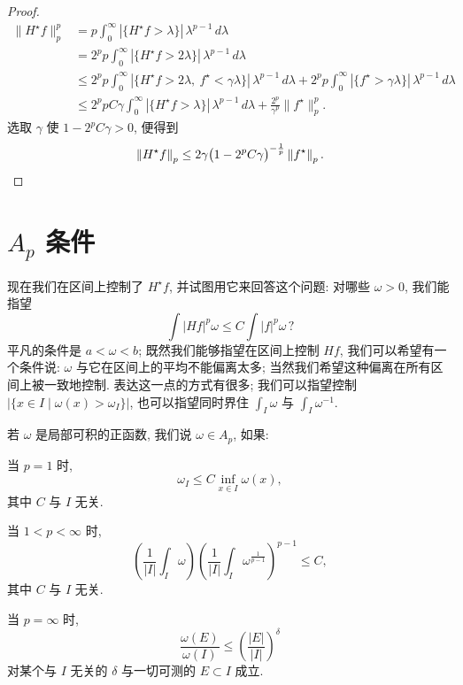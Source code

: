 \begin{proof}
\begin{align*}
\|H^{\star}f\|_{p}^{p}
&=p\int_{0}^{\infty}|\{H^{\star}f>\lambda\}|\,\lambda^{p-1}\,d\lambda \\
&=2^{p}p\int_{0}^{\infty}|\{H^{\star}f>2\lambda\}|\,\lambda^{p-1}\,d\lambda \\
&\leq 2^{p}p\int_{0}^{\infty}|\{H^{\star}f>2\lambda,\ f^{\star}<\gamma\lambda\}|\,\lambda^{p-1}\,d\lambda
+2^{p}p\int_{0}^{\infty}|\{f^{\star}>\gamma\lambda\}|\,\lambda^{p-1}\,d\lambda \\
&\leq 2^{p}pC\gamma\int_{0}^{\infty}|\{H^{\star}f>\lambda\}|\,\lambda^{p-1}\,d\lambda
+\frac{2^{p}}{\gamma^{p}}\|f^{\star}\|_{p}^{p}.
\end{align*}
选取 $\gamma$ 使 $1-2^{p}C\gamma>0$, 便得到
\[
\left\|H^{\star}f\right\|_{p}\leq 2\gamma\bigl(1-2^{p}C\gamma\bigr)^{-\frac{1}{p}}\left\|f^{\star}\right\|_{p}. \qedhere
\]
\end{proof}

\section{\texorpdfstring{$A_p$}{Ap} 条件}
\label{sec:3.2}

现在我们在区间上控制了 $H^{\star}f$, 并试图用它来回答这个问题: 对哪些 $\omega>0$, 我们能指望
\[
\int|H f|^{p}\omega\leq C\int|f|^{p}\omega\,?
\]
平凡的条件是 $a<\omega<b$; 既然我们能够指望在区间上控制 $Hf$, 我们可以希望有一个条件说: $\omega$ 与它在区间上的平均不能偏离太多; 当然我们希望这种偏离在所有区间上被一致地控制. 表达这一点的方式有很多; 我们可以指望控制 $|\{x\in I \mid \omega(x)>\omega_I\}|$, 也可以指望同时界住 $\int_I\omega$ 与 $\int_I\omega^{-1}$.

\begin{definition}\label{def:3.3}
若 $\omega$ 是局部可积的正函数, 我们说 $\omega\in A_p$, 如果:

当 $p=1$ 时,
\[
\omega_{I}\leq C\inf_{x\in I}\omega(x),
\]
其中 $C$ 与 $I$ 无关.

当 $1<p<\infty$ 时,
\[
\left(\frac{1}{|I|}\int_{I}\omega\right)\left(\frac{1}{|I|}\int_{I}\omega^{\frac{1}{p-1}}\right)^{p-1}\leq C,
\]
其中 $C$ 与 $I$ 无关.

当 $p=\infty$ 时,
\[
\frac{\omega(E)}{\omega(I)}\leq\left(\frac{|E|}{|I|}\right)^{\delta}
\]
对某个与 $I$ 无关的 $\delta$ 与一切可测的 $E\subset I$ 成立.
\end{definition}


